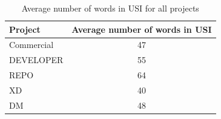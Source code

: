 \begin{table}[h]
    \centering
    \caption{Average number of words in USI for all projects}
    \begin{tabular}{l|c}
	 \toprule
    Project & \hfil Average number of words in USI \\
    \midrule
      Commercial  & 47   \\ 
      DEVELOPER   & 55 \\
      REPO        & 64   \\
      XD          & 40  \\
      DM          & 48  \\
      \bottomrule
    \end{tabular}
\label{Table:avg_word_num}
\end{table}





 




